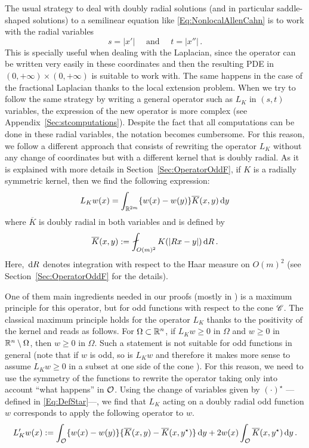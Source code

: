 The usual strategy to deal with doubly radial solutions (and in particular saddle-shaped solutions) to a semilinear equation like \eqref{Eq:NonlocalAllenCahn} is to work with the radial variables 
$$
s = |x'| \quad \text{ and } \quad t=|x''|\,.
$$
This is specially useful when dealing with the Laplacian, since the operator can be written very easily in these coordinates and then the resulting PDE in $(0,+\infty)\times (0,+\infty)$ is suitable to work with. The same happens in the case of the fractional Laplacian thanks to the local extension problem. When we try to follow the same strategy by writing a general operator such as $L_K$ in $(s,t)$ variables, the expression of the new operator is more complex (see Appendix~\ref{Sec:stcomputations}). Despite the fact that all computations can be done in these radial variables, the notation becomes cumbersome. For this reason, we follow a different approach that consists of rewriting the operator $L_K$ without any change of coordinates but with a different kernel that is doubly radial. As it is explained with more details in Section~\ref{Sec:OperatorOddF}, if $K$ is a radially symmetric kernel, then we find the following expression:
$$
L_K w(x) = \int_{\mathbb{R}^{2m}} \{w(x) - w(y)\} \overline{K}(x,y) \,\mathrm{d} y
$$
where $\overline{K}$ is doubly radial in both variables and is defined by
\begin{equation}
\label{Eq:KbarDef'}
\overline{K}(x,y) := \average_{O(m)^2} K(|Rx - y|)\d R\,.
\end{equation}
Here, $\,\mathrm{d} R$ denotes integration with respect to the Haar measure on $O(m)^2$ (see Section~\ref{Sec:OperatorOddF} for the details).


One of them main ingredients needed in our proofs (mostly in \cite{FelipeSanz-Perela:IntegroDifferentialII}) is a maximum principle for this operator, but for odd functions with respect to the cone $\mathscr{C}$. The classical maximum principle holds for the operator $L_K$ thanks to the positivity of the kernel and reads as follows. For $\Omega \subset \mathbb{R}^n$, if $L_K w \geq 0$ in $\Omega$ and $w \geq 0$ in $\mathbb{R}^n \setminus \Omega$, then $w\geq 0$ in $\Omega$. Such a statement is not suitable for odd functions in general (note that if $w$ is odd, so is $L_K w$ and therefore it makes more sense to assume $L_K w \geq 0$ in a subset  at one side of the cone ). For this reason, we need to use the symmetry of the functions to rewrite the operator taking only into account ``what happens'' in $\mathcal{O}$. Using the change of variables given by $(\cdot)^\star$ ---defined in \eqref{Eq:DefStar}---, we find that $L_K$ acting on a doubly radial odd function $w$ corresponds to apply the following operator to $w$. 
\begin{equation}
	L_K' w (x) := \int_{\mathcal{O}} \{w(x) - w(y) \} \{\overline{K}(x, y) - \overline{K}(x, y^\star)  \} \,\mathrm{d} y +  2 w(x) \int_{\mathcal{O}} \overline{K}(x, y^\star) \,\mathrm{d} y \,.
\end{equation}


